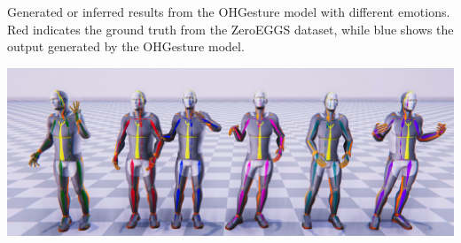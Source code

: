 Generated or inferred results from the OHGesture model with different emotions. Red indicates the ground truth from the ZeroEGGS dataset, while blue shows the output generated by the OHGesture model.

\begin{center}
	\centering
	\includegraphics[width=\linewidth]{figures/ListOfEmotion}
	
%			
\end{center}

%
%
%
%

%
